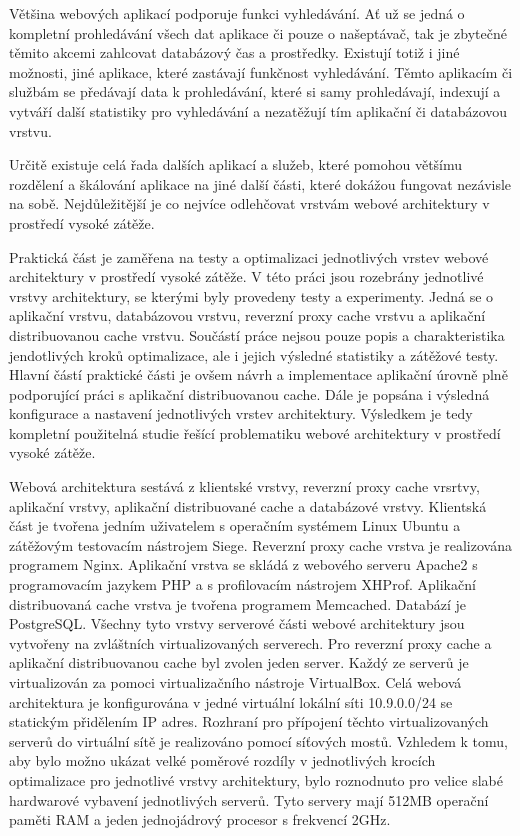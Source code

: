 \documentclass[12pt]{article}
\begin{document}
Většina webových aplikací podporuje funkci vyhledávání. Ať už se jedná o kompletní prohledávání všech dat aplikace či pouze o našeptávač, tak je zbytečné těmito akcemi zahlcovat databázový čas a prostředky. Existují totiž i jiné možnosti, jiné aplikace, které zastávají funkčnost vyhledávání. Těmto aplikacím či službám se předávají data k prohledávání, které si samy prohledávají, indexují a vytváří další statistiky pro vyhledávání a nezatěžují tím aplikační či databázovou vrstvu.

Určitě existuje celá řada dalších aplikací a služeb, které pomohou většímu rozdělení a škálování aplikace na jiné další části, které dokážou fungovat nezávisle na sobě. Nejdůležitější je co nejvíce odlehčovat vrstvám webové architektury v prostředí vysoké zátěže.



Praktická část je zaměřena na testy a optimalizaci jednotlivých vrstev webové architektury v prostředí vysoké zátěže. V této práci jsou rozebrány jednotlivé vrstvy architektury, se kterými byly provedeny testy a experimenty. Jedná se o aplikační vrstvu, databázovou vrstvu, reverzní proxy cache vrstvu a aplikační distribuovanou cache vrstvu. Součástí práce nejsou pouze popis a charakteristika jendotlivých kroků optimalizace, ale i jejich výsledné statistiky a zátěžové testy. Hlavní částí praktické části je ovšem návrh a implementace aplikační úrovně plně podporující práci s aplikační distribuovanou cache. Dále je popsána i výsledná konfigurace a nastavení jednotlivých vrstev architektury. Výsledkem je tedy kompletní použitelná studie řešící problematiku webové architektury v prostředí vysoké zátěže.

Webová architektura sestává z klientské vrstvy, reverzní proxy cache vrsrtvy, aplikační vrstvy, aplikační distribuované cache a databázové vrstvy. Klientská část je tvořena jedním uživatelem s operačním systémem Linux Ubuntu a zátěžovým testovacím nástrojem Siege. Reverzní proxy cache vrstva je realizována programem Nginx. Aplikační vrstva se skládá z webového serveru Apache2 s programovacím jazykem PHP a s profilovacím nástrojem XHProf. Aplikační distribuovaná cache vrstva je tvořena programem Memcached. Databází je PostgreSQL. Všechny tyto vrstvy serverové části webové architektury jsou vytvořeny na zvláštních virtualizovaných serverech. Pro reverzní proxy cache a aplikační distribuovanou cache byl zvolen jeden server. Každý ze serverů je virtualizován za pomoci virtualizačního nástroje VirtualBox. Celá webová architektura je konfigurována v jedné virtuální lokální síti 10.9.0.0/24 se statickým přidělením IP adres. Rozhraní pro přípojení těchto virtualizovaných serverů do virtuální sítě je realizováno pomocí síťových mostů. Vzhledem k tomu, aby bylo možno ukázat velké poměrové rozdíly v jednotlivých krocích optimalizace pro jednotlivé vrstvy architektury, bylo roznodnuto pro velice slabé hardwarové vybavení jednotlivých serverů. Tyto servery mají 512MB operační paměti RAM a jeden jednojádrový procesor s frekvencí 2GHz.
\end{document}
